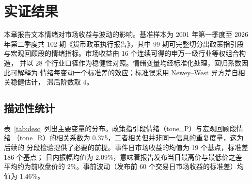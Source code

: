
\section{实证结果}

本章报告文本情绪对市场收益与波动的影响。基准样本为 2001 年第一季度至
2026 年第二季度共 102 期《货币政策执行报告》，其中 99 期可完整切分出政策指引段
与宏观回顾段的情绪指标。市场收益由 16 个连续可得的申万一级行业等权组合构造，
并以 28 个行业口径作为稳健性对照。情绪变量均经标准化处理，回归系数因此可解释为
情绪每变动一个标准差的效应；标准误采用 Newey--West 异方差自相关稳健估计，
滞后阶数取 4。

\subsection{描述性统计}

表~\ref{tab:desc} 列出主要变量的分布。政策指引段情绪（tone\_P）与宏观回顾段情绪
（tone\_R）的相关系数为 0.375，二者相关但并非同一信息的重复度量，这为后续的
分段检验提供了必要的前提。事件日市场收益的均值为 19 个基点，标准差 186 个基点；
日内振幅均值为 2.09\%，意味着报告发布当日最高价与最低价之差平均约为前收盘价的
2\%。事前波动（发布前 60 个交易日市场收益的标准差）均值为 1.46\%。

